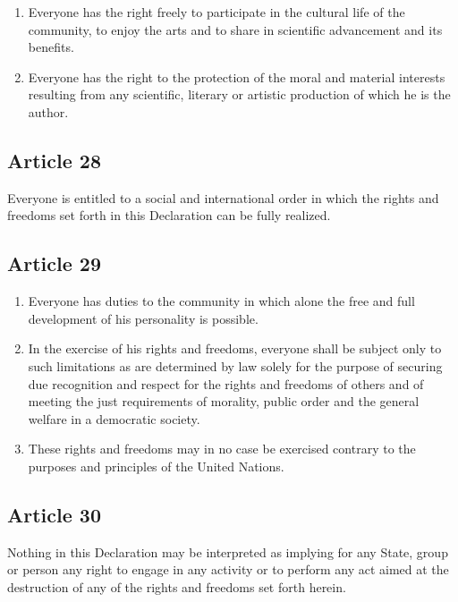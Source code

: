 \documentclass[
  ngerman,
  american,
  titlepage,
  openright,
  DIV=calc,
  toc=listof,
  listof=nochaptergap]{scrbook}
\begin{document}
\begin{enumerate}
\def\labelenumi{\arabic{enumi}.}
\item
  Everyone has the right freely to participate in the cultural life of
  the community, to enjoy the arts and to share in scientific
  advancement and its benefits.
\item
  Everyone has the right to the protection of the moral and material
  interests resulting from any scientific, literary or artistic
  production of which he is the author.
\end{enumerate}

\subsection{Article 28}\label{article-28-3}

Everyone is entitled to a social and international order in which the
rights and freedoms set forth in this Declaration can be fully realized.

\subsection{Article 29}\label{article-29-3}

\begin{enumerate}
\def\labelenumi{\arabic{enumi}.}
\item
  Everyone has duties to the community in which alone the free and full
  development of his personality is possible.
\item
  In the exercise of his rights and freedoms, everyone shall be subject
  only to such limitations as are determined by law solely for the
  purpose of securing due recognition and respect for the rights and
  freedoms of others and of meeting the just requirements of morality,
  public order and the general welfare in a democratic society.
\item
  These rights and freedoms may in no case be exercised contrary to the
  purposes and principles of the United Nations.
\end{enumerate}

\subsection{Article 30}\label{article-30-3}

Nothing in this Declaration may be interpreted as implying for any
State, group or person any right to engage in any activity or to perform
any act aimed at the destruction of any of the rights and freedoms set
forth herein.
\end{document}
